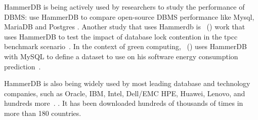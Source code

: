 



HammerDB is being actively used by researchers to study the performance of DBMS: \citeauthor{elgrablyanalise} use HammerDB to compare open-source DBMS performance like Mysql, MariaDB and Postgres \cite{elgrablyanalise}. Another study that uses Hammerdb is \citeauthor{knoche2016combining}~(\citeyear{knoche2016combining}) work that uses HammerDB to test the impact of database lock contention in the \gls{tpcc} benchmark scenario~\cite{knoche2016combining}. In the context of green computing,  \citeauthor{koccak2018software}~(\citeyear{koccak2018software}) uses HammerDB with MySQL to define a dataset to use on his software energy consumption prediction~\cite{koccak2018software}. 

HammerDB is also being widely used by most leading database and technology companies, such as Oracle, IBM, Intel, Dell/EMC HPE, Huawei, Lenovo, and hundreds more~\cite{hammerdb}. . It has been downloaded hundreds of thousands of times in more than 180 countries.







